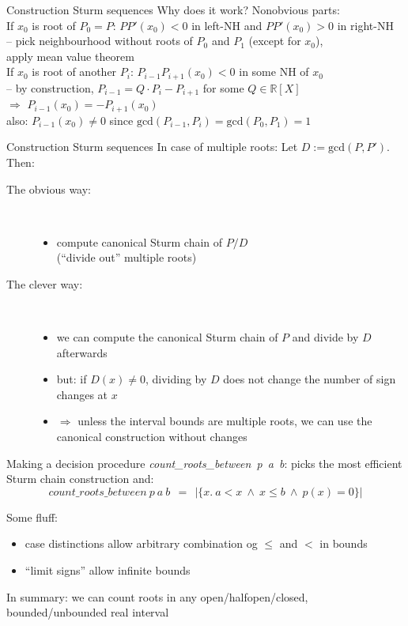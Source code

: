 \documentclass[%
	sans,			%
	mathsans,		%
	10pt,
	t		%
	slidescentered,%
]{beamer}
\newcommand{\RR}{\mathbb{R}}
\begin{document}
\begin{frame}{Construction Sturm sequences}
Why does it work? Nonobvious parts:\\[3mm]

If $x_0$ is root of $P_0 = P$: $PP'(x_0) < 0$ in left-NH and $PP'(x_0) > 0$ in right-NH\\
-- pick neighbourhood without roots of $P_0$ and $P_1$ (except for $x_0$),\\
\hskip3mm apply mean value theorem\\[3mm]

If $x_0$ is root of another $P_i$: $P_{i-1}P_{i+1}(x_0) < 0$ in some NH of $x_0$\\
-- by construction, $P_{i-1} = Q\cdot P_i - P_{i+1}$ for some $Q\in\RR[X]$\\
\hskip3mm$\Longrightarrow$ $P_{i-1}(x_0) = -P_{i+1}(x_0)$\\
\hskip3mm also: $P_{i-1}(x_0)\neq 0$ since $\mathrm{gcd}(P_{i-1}, P_i) = \mathrm{gcd}(P_0,P_1) = 1$
\end{frame}

\begin{frame}{Construction Sturm sequences}
In case of multiple roots: Let $D := \mathrm{gcd}(P,P')$. Then:
\begin{description}
\item[The obvious way:]\ \\
\begin{itemize}
\item compute canonical Sturm chain of $P / D$\\ (\enquote{divide out} multiple roots)
\end{itemize}
\item[The clever way:]\ \\
\begin{itemize}
\item we can compute the canonical Sturm chain of $P$ and divide by $D$ afterwards
\item but: if $D(x)\neq 0$, dividing by $D$ does not change the number of sign changes at $x$
\item $\Longrightarrow$ unless the interval bounds are multiple roots, we can use the canonical construction without changes
\end{itemize}
\end{description}
\end{frame}

\begin{frame}{Making a decision procedure}
\textit{count\_roots\_between\ p\ a\ b}: picks the most efficient Sturm chain construction and:
$$\textit{count\_roots\_between}\ p\ a\ b\ \ =\ \ |\{x.\ a < x\ \wedge\ x \leq b\ \wedge\ p(x) = 0\}|$$\vskip2mm

Some fluff:
\begin{itemize}
\item case distinctions allow arbitrary combination og $\leq$ and $<$ in bounds
\item \enquote{limit signs} allow infinite bounds
\end{itemize}
In summary: we can count roots in any open/halfopen/closed, bounded/unbounded real interval
\end{frame}
\end{document}
